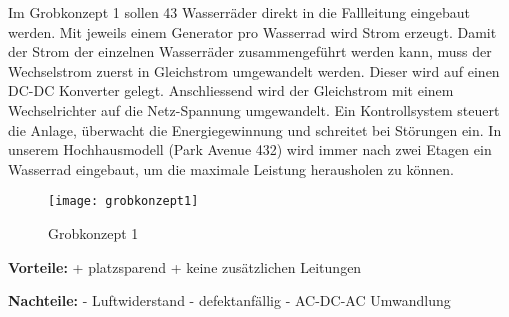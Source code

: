 Im Grobkonzept 1 sollen 43 Wasserräder direkt in die Fallleitung eingebaut werden. Mit jeweils einem Generator pro Wasserrad wird Strom erzeugt. Damit der Strom der einzelnen Wasserräder zusammengeführt werden kann, muss der Wechselstrom zuerst in Gleichstrom umgewandelt werden. Dieser wird auf einen DC-DC Konverter gelegt. Anschliessend wird der Gleichstrom mit einem Wechselrichter auf die Netz-Spannung umgewandelt. Ein Kontrollsystem steuert die Anlage, überwacht die Energiegewinnung und schreitet bei Störungen ein. In unserem Hochhausmodell (Park Avenue 432) wird immer nach zwei Etagen ein Wasserrad eingebaut, um die maximale Leistung herausholen zu können. 
\newpage
\begin{wrapfigure}{r}{0.5\textwidth}
  \begin{center}
    \texttt{[image: grobkonzept1]}
  \end{center}
  \caption{Grobkonzept 1}
\end{wrapfigure}
\bigskip

\textbf{Vorteile:}								\newline
+	platzsparend									\newline
+	keine zusätzlichen Leitungen
	
\textbf{Nachteile:}								\newline
-	Luftwiderstand								\newline
- 	defektanfällig								\newline
-	AC-DC-AC Umwandlung							\newline
\WFclear
\newpage

